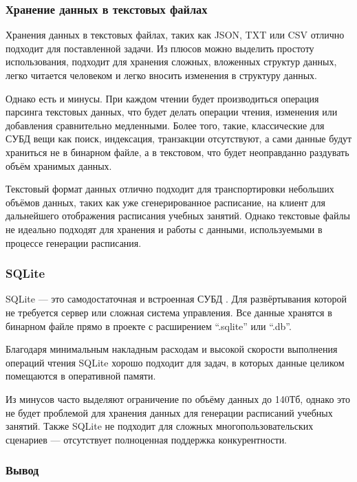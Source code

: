 \subsubsection{Хранение данных в текстовых файлах}

Хранения данных в текстовых файлах, таких как JSON, TXT или CSV отлично подходит для поставленной задачи. Из плюсов можно выделить простоту использования, подходит для хранения сложных, вложенных структур данных, легко читается человеком и легко вносить изменения в структуру данных.

Однако есть и минусы. При каждом чтении будет производиться операция парсинга текстовых данных, что будет делать операции чтения, изменения или добавления сравнительно медленными. Более того, такие, классические для СУБД вещи как поиск, индексация, транзакции отсутствуют, а сами данные будут храниться не в бинарном файле, а в текстовом, что будет неоправданно раздувать объём хранимых данных.

Текстовый формат данных отлично подходит для транспортировки небольших объёмов данных, таких как уже сгенерированное расписание, на клиент для дальнейшего отображения расписания учебных занятий. Однако текстовые файлы не идеально подходят для хранения и работы с данными, используемыми в процессе генерации расписания.

\subsubsection{SQLite}

SQLite --- это самодостаточная и встроенная СУБД \cite{sqlite:docs}. Для развёртывания которой не требуется сервер или сложная система управления. Все данные хранятся в бинарном файле прямо в проекте с расширением “.sqlite” или “.db”.

Благодаря минимальным накладным расходам и высокой скорости выполнения операций чтения SQLite хорошо подходит для задач, в которых данные целиком помещаются в оперативной памяти.

Из минусов часто выделяют ограничение по объёму данных до 140Тб, однако это не будет проблемой для хранения данных для генерации расписаний учебных занятий. Также SQLite не подходит для сложных многопользовательских сценариев --- отсутствует полноценная поддержка конкурентности.

\subsubsection{Вывод}

